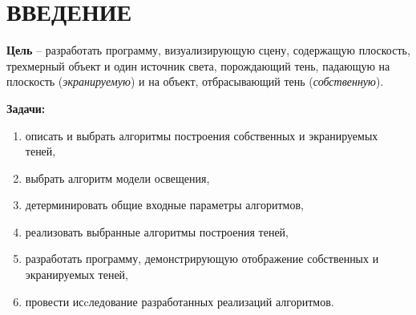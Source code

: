\chapter*{ВВЕДЕНИЕ}

\textbf{Цель} -- разработать программу, визуализирующую сцену, содержащую плоскость,
трехмерный объект и один источник света, порождающий тень, падающую на плоскость (\textit{экранируемую}) и
на объект, отбрасывающий тень (\textit{собственную}).

\textbf{Задачи:}

\begin{enumerate}[label=\arabic*), labelsep=0.5em]
    \item описать и выбрать алгоритмы построения собственных и экранируемых теней,
    \item выбрать алгоритм модели освещения,
    \item детерминировать общие входные параметры алгоритмов,
    \item реализовать выбранные алгоритмы построения теней,
    \item разработать программу, демонстрирующую отображение собственных и экранируемых теней,
    \item провести исcледование разработанных реализаций алгоритмов.
\end{enumerate}